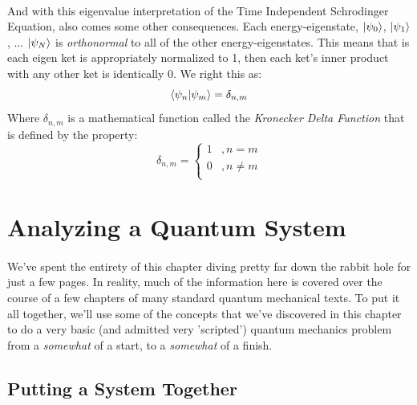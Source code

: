 \documentclass[12pt,letterpaper]{book}
\begin{document}
\paragraph*{}And with this eigenvalue interpretation of the Time Independent Schrodinger Equation, also comes some other consequences. Each energy-eigenstate, $\ket{\psi_0}$, $\ket{\psi_1}$, ...  $\ket{\psi_N}$ is \textit{orthonormal} to all of the other energy-eigenstates. This means that is each eigen ket is appropriately normalized to 1, then each ket's inner product with any other ket is identically 0. We right this as:
\begin{equation}
\label{orthonorm}
\braket{\psi_n}{\psi_m} = \delta_{n,m}
\end{equation}
Where $\delta_{n,m}$ is a mathematical function called the \textit{Kronecker Delta Function} that is defined by the property:
\begin{equation}
\label{kronecker}
\delta_{n,m} = 
	\left\{
        \begin{array}{ll}
            1 	&, n = m \\
            0 	&, n \neq m \\
        \end{array}
    \right.
\end{equation}



\section{Analyzing a Quantum System}
\paragraph*{}We've spent the entirety of this chapter diving pretty far down the rabbit hole for just a few pages. In reality, much of the information here is covered over the course of a few chapters of many standard quantum mechanical texts. To put it all together, we'll use some of the concepts that we've discovered in this chapter to do a very basic (and admitted very 'scripted') quantum mechanics problem from a \textit{somewhat} of a start, to a \textit{somewhat} of a finish. 


\subsection*{Putting a System Together}
\end{document}

